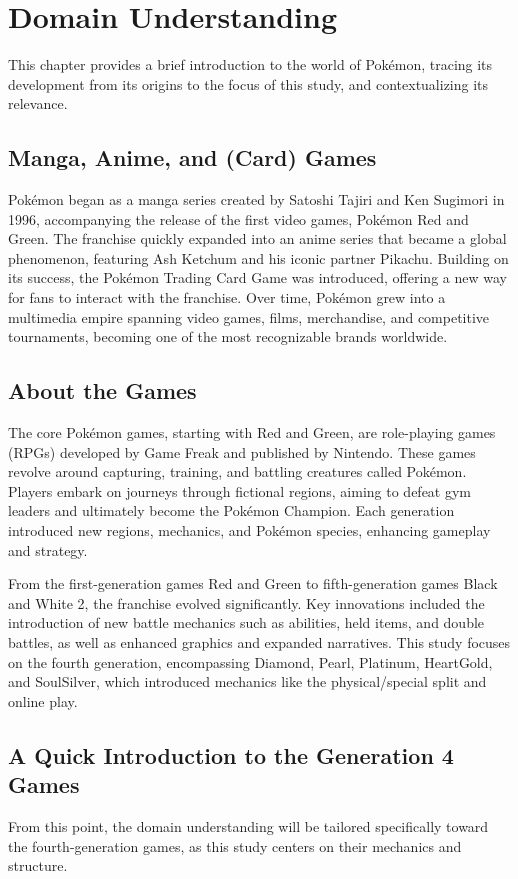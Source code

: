 \chapter{Domain Understanding}

This chapter provides a brief introduction to the world of Pokémon, tracing its development from its origins to the focus of this study, and contextualizing its relevance.

\section{Manga, Anime, and (Card) Games}
Pokémon began as a manga series created by Satoshi Tajiri and Ken Sugimori in 1996, accompanying the release of the first video games, Pokémon Red and Green. The franchise quickly expanded into an anime series that became a global phenomenon, featuring Ash Ketchum and his iconic partner Pikachu. Building on its success, the Pokémon Trading Card Game was introduced, offering a new way for fans to interact with the franchise. Over time, Pokémon grew into a multimedia empire spanning video games, films, merchandise, and competitive tournaments, becoming one of the most recognizable brands worldwide.

\section{About the Games}
The core Pokémon games, starting with Red and Green, are role-playing games (RPGs) developed by Game Freak and published by Nintendo. These games revolve around capturing, training, and battling creatures called Pokémon. Players embark on journeys through fictional regions, aiming to defeat gym leaders and ultimately become the Pokémon Champion. Each generation introduced new regions, mechanics, and Pokémon species, enhancing gameplay and strategy.

From the first-generation games Red and Green to fifth-generation games Black and White 2, the franchise evolved significantly. Key innovations included the introduction of new battle mechanics such as abilities, held items, and double battles, as well as enhanced graphics and expanded narratives. This study focuses on the fourth generation, encompassing Diamond, Pearl, Platinum, HeartGold, and SoulSilver, which introduced mechanics like the physical/special split and online play.

\section{A Quick Introduction to the Generation 4 Games}
From this point, the domain understanding will be tailored specifically toward the fourth-generation games, as this study centers on their mechanics and structure.

